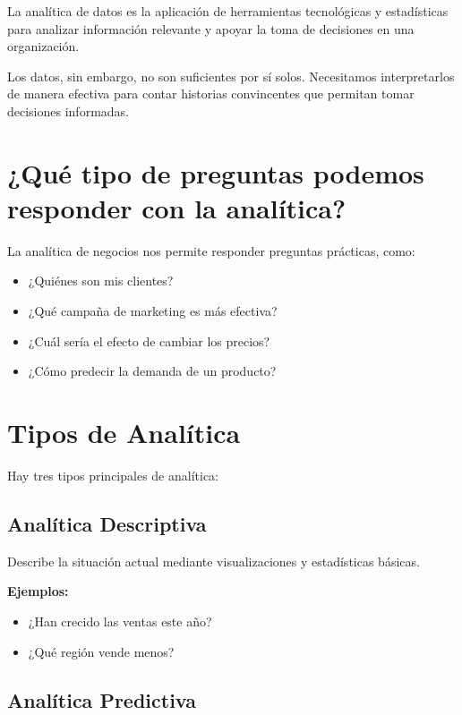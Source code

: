 \documentclass[
  spanish,
  letterpaper,
  DIV=11,
  numbers=noendperiod]{scrreprt}
\providecommand{\tightlist}{%
  \setlength{\itemsep}{0pt}\setlength{\parskip}{0pt}}
\begin{document}
La analítica de datos es la aplicación de herramientas tecnológicas y
estadísticas para analizar información relevante y apoyar la toma de
decisiones en una organización.

Los datos, sin embargo, no son suficientes por sí solos. Necesitamos
interpretarlos de manera efectiva para contar historias convincentes que
permitan tomar decisiones informadas.

\section{¿Qué tipo de preguntas podemos responder con la
analítica?}\label{quuxe9-tipo-de-preguntas-podemos-responder-con-la-analuxedtica}

La analítica de negocios nos permite responder preguntas prácticas,
como:

\begin{itemize}
\tightlist
\item
  ¿Quiénes son mis clientes?
\item
  ¿Qué campaña de marketing es más efectiva?
\item
  ¿Cuál sería el efecto de cambiar los precios?
\item
  ¿Cómo predecir la demanda de un producto?
\end{itemize}

\section{Tipos de Analítica}\label{tipos-de-analuxedtica}

Hay tres tipos principales de analítica:

\subsection{Analítica Descriptiva}\label{analuxedtica-descriptiva}

Describe la situación actual mediante visualizaciones y estadísticas
básicas.

\textbf{Ejemplos:}

\begin{itemize}
\tightlist
\item
  ¿Han crecido las ventas este año?
\item
  ¿Qué región vende menos?
\end{itemize}

\subsection{Analítica Predictiva}\label{analuxedtica-predictiva}
\end{document}
